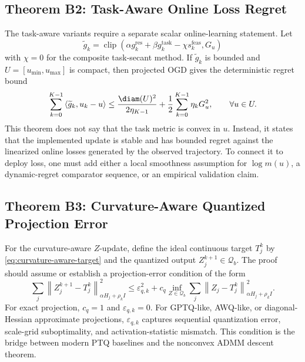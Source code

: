\documentclass[11pt]{article}
\newcommand{\clip}{\operatorname{clip}}
\newcommand{\norm}[1]{\left\lVert #1 \right\rVert}
\newcommand{\ip}[2]{\left\langle #1,#2 \right\rangle}
\newcommand{\Q}{\mathcal{Q}}
\begin{document}
\subsection{Theorem B2: Task-Aware Online Loss Regret}

The task-aware variants require a separate scalar online-learning statement.
Let
\[
    \widetilde g_k
    =
    \clip\left(
        \alpha g_k^{\mathrm{res}}
        +\beta g_k^{\mathrm{task}}
        -\chi s_k^{\mathrm{feas}},
        G_u
    \right)
\]
with \(\chi=0\) for the composite task-secant method.  If
\(\widetilde g_k\) is bounded and \(U=[u_{\min},u_{\max}]\) is compact, then
projected OGD gives the deterministic regret bound
\begin{equation}
    \sum_{k=0}^{K-1}
    \ip{\widetilde g_k}{u_k-u}
    \le
    \frac{\diam(U)^2}{2\eta_{K-1}}
    +
    \frac{1}{2}\sum_{k=0}^{K-1}\eta_k G_u^2,
    \qquad \forall u\in U.
    \label{eq:task-aware-regret}
\end{equation}
This theorem does not say that the task metric is convex in \(u\).  Instead,
it states that the implemented update is stable and has bounded regret against
the linearized online losses generated by the observed trajectory.  To connect
it to deploy loss, one must add either a local smoothness assumption for
\(\log m(u)\), a dynamic-regret comparator sequence, or an empirical
validation claim.

\subsection{Theorem B3: Curvature-Aware Quantized Projection Error}

For the curvature-aware \(Z\)-update, define the ideal continuous target
\(T_j^k\) by \eqref{eq:curvature-aware-target} and the quantized output
\(Z_j^{k+1}\in\Q_b\).  The proof should assume or establish a projection-error
condition of the form
\begin{equation}
    \sum_j
    \norm{Z_j^{k+1}-T_j^k}_{\alpha H_j+\rho_k I}^2
    \le
    \varepsilon_{q,k}^2
    +
    c_q
    \inf_{Z\in\Q_b}
    \sum_j
    \norm{Z_j-T_j^k}_{\alpha H_j+\rho_k I}^2.
    \label{eq:curvature-projection-error}
\end{equation}
For exact projection, \(c_q=1\) and \(\varepsilon_{q,k}=0\).  For GPTQ-like,
AWQ-like, or diagonal-Hessian approximate projections, \(\varepsilon_{q,k}\)
captures sequential quantization error, scale-grid suboptimality, and
activation-statistic mismatch.  This condition is the bridge between modern
PTQ baselines and the nonconvex ADMM descent theorem.
\end{document}

